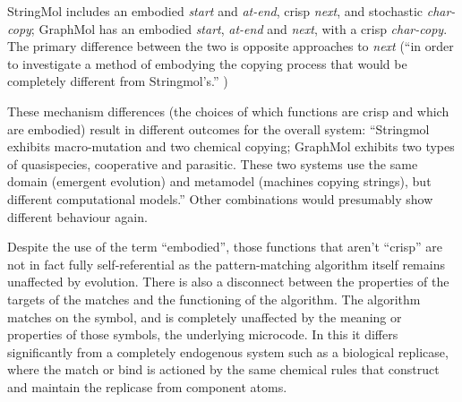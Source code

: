 StringMol includes an embodied \emph{start} and \emph{at-end}, crisp \emph{next}, and stochastic \emph{char-copy}; GraphMol has an embodied \emph{start}, \emph{at-end} and \emph{next}, with a crisp \emph{char-copy}. The primary difference between the two is opposite approaches to \emph{next} (``in order to investigate a method of embodying the copying process that would be completely different from Stringmol's.'' \parencite[p.145]{Nellis2012})

These mechanism differences (the choices of which functions are crisp and which are embodied) result in different outcomes for the overall system: ``Stringmol exhibits macro-mutation and two chemical copying; GraphMol exhibits two types of quasispecies, cooperative and parasitic. These two systems use the same domain (emergent evolution) and metamodel (machines copying strings), but different computational models.'' Other combinations would presumably show different behaviour again.

Despite the use of the term ``embodied'', those functions that aren't ``crisp'' are not in fact fully self-referential as the pattern-matching algorithm itself remains unaffected by evolution. There is also a disconnect between the properties of the targets of the matches and the functioning of the algorithm. The algorithm matches on the symbol, and is completely unaffected by the meaning or properties of those symbols, the underlying microcode. In this it differs significantly from a completely endogenous system such as a biological replicase, where the match or bind is actioned by the same chemical rules that construct and maintain the replicase from component atoms.

